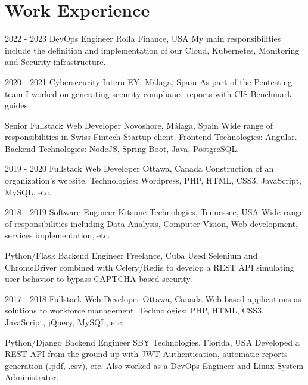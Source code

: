 \documentclass[]{friggeri-cv}
\begin{document}
\section{Work Experience}
\begin{entrylist}
  \entry
    {2022 - 2023}
    {DevOps Engineer}
    {Rolla Finance, USA}
    {My main responsibilities include the definition and implementation of our Cloud, Kubernetes, Monitoring and Security infrastructure.\\}

  \entry
    {2020 - 2021}
    {Cybersecurity Intern}
    {EY, Málaga, Spain}
    {As part of the Pentesting team I worked on generating security compliance reports with CIS Benchmark guides.\\}

  \entry
    {}
    {Senior Fullstack Web Developer}
    {Novoshore, Málaga, Spain}
    {Wide range of responsibilities in Swiss Fintech Startup client. Frontend Technologies: Angular. Backend Technologies: NodeJS, Spring Boot, Java, PostgreSQL.\\}

  \entry
    {2019 - 2020}
    {Fullstack Web Developer}
    {Ottawa, Canada} %
    {Construction of an organization's website. Technologies: Wordpress, PHP, HTML, CSS3, JavaScript, MySQL, etc.\\} 

  \entry
    {2018 - 2019}
    {Software Engineer}
    {Kitsune Technologies, Tennessee, USA}
    {Wide range of responsibilities including Data Analysis, Computer Vision, Web development, services implementation, etc.\\}

  \entry
    {}
    {Python/Flask Backend Engineer}
    {Freelance, Cuba} %
    {Used Selenium and ChromeDriver combined with Celery/Redis to develop a REST API simulating user behavior to bypass CAPTCHA-based security.\\}  

  \entry
    {2017 - 2018}
    {Fullstack Web Developer}
    {Ottawa, Canada} %
    {Web-based applications as solutions to workforce management. Technologies: PHP, HTML, CSS3, JavaScript, jQuery, MySQL, etc.\\} 

  \entry
    {}
    {Python/Django Backend Engineer}
    {SBY Technologies, Florida, USA}
    {Developed a REST API from the ground up with JWT Authentication, automatic reports generation (.pdf, .csv), etc. Also worked as a DevOps Engineer and Linux System Administrator.\\}    


\end{entrylist}
\end{document}
